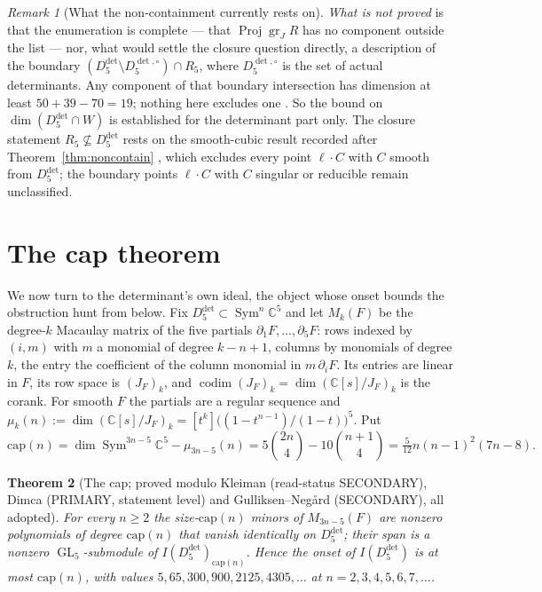 \documentclass[11pt]{amsart}
\theoremstyle{plain}
\newtheorem{theorem}{Theorem}[section]
\theoremstyle{definition}
\theoremstyle{remark}
\newtheorem{remark}[theorem]{Remark}
\DeclareMathOperator{\GL}{GL}
\DeclareMathOperator{\Sym}{Sym}
\DeclareMathOperator{\codim}{codim}
\newcommand{\bC}{\mathbb{C}}
\newcommand{\Rr}{R}
\newcommand{\Ddet}{D^{\det}}
\begin{document}
\begin{remark}[What the non-containment currently rests on]
\emph{What is not proved} is that the enumeration is complete --- that
$\operatorname{Proj}\operatorname{gr}_J R$ has no component outside the list ---
nor, what would settle the closure question directly, a description of the
boundary
$(\Ddet_5\setminus D^{\det,\circ}_5)\cap\Rr_5$, where $D^{\det,\circ}_5$ is the set
of actual determinants.  Any component of that boundary intersection has
dimension at least $50+39-70=19$; nothing here excludes one \cite{Companion3}.  So the bound on
$\dim(\Ddet_5\cap W)$ is established for the determinant part only.  The
closure statement $\Rr_5\not\subseteq\Ddet_5$ rests on the smooth-cubic result
recorded after Theorem~\ref{thm:noncontain} \cite{Companion2}, which excludes
every point $\ell\cdot C$ with $C$ smooth from $\Ddet_5$; the boundary points
$\ell\cdot C$ with $C$ singular or reducible remain unclassified.
\end{remark}

\section{The cap theorem}\label{sec:cap}

We now turn to the determinant's own ideal, the object whose onset bounds the
obstruction hunt from below.  Fix $\Ddet_5\subset\Sym^{n}\bC^{5}$ and let
$M_k(F)$ be the degree-$k$ Macaulay matrix of the five partials
$\partial_1F,\dots,\partial_5F$: rows indexed by $(i,m)$ with $m$ a monomial of
degree $k-n+1$, columns by monomials of degree $k$, the entry the coefficient
of the column monomial in $m\,\partial_iF$.  Its entries are linear in $F$, its
row space is $(J_F)_k$, and $\codim(J_F)_k=\dim(\bC[s]/J_F)_k$ is the corank.
For smooth $F$ the partials are a regular sequence and
$\mu_k(n):=\dim(\bC[s]/J_F)_k=[t^k]\big((1-t^{n-1})/(1-t)\big)^{5}$.  Put
\[
  \mathrm{cap}(n)=\dim\Sym^{3n-5}\bC^{5}-\mu_{3n-5}(n)
  =5\binom{2n}{4}-10\binom{n+1}{4}=\tfrac{5}{12}n(n-1)^{2}(7n-8).
\]

\begin{theorem}[The cap; proved modulo Kleiman \cite{Kleiman} (read-status
SECONDARY), Dimca {\cite[Thm.~3.1]{Dimca13}} (PRIMARY, statement level) and
Gulliksen--Neg\aa rd \cite{GN} (SECONDARY), all adopted]\label{thm:cap}
For every $n\ge2$ the size-$\mathrm{cap}(n)$ minors of $M_{3n-5}(F)$ are
nonzero polynomials of degree $\mathrm{cap}(n)$ that vanish identically on
$\Ddet_5$; their span is a nonzero $\GL_5$-submodule of $I(\Ddet_5)_{\mathrm{cap}(n)}$.
Hence the onset of $I(\Ddet_5)$ is at most $\mathrm{cap}(n)$, with values
$5,65,300,900,2125,4305,\dots$ at $n=2,3,4,5,6,7,\dots$.
\end{theorem}
\end{document}
